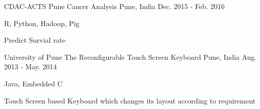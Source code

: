 

\begin{cventries}

  \cventry
    {CDAC-ACTS Pune} %
    {Cancer Analysis} %
    {Pune, India} %
    {Dec. 2015 - Feb. 2016} %
    {
      \begin{cvitems} %
        \item {R, Python, Hadoop, Pig}
        \item {Predict Survial rate}
      \end{cvitems}
    }
  
  \cventry
    {University of Pune} %
    {The Reconfigurable Touch Screen Keyboard} %
    {Pune, India} %
    {Aug. 2013 - May. 2014} %
    {
      \begin{cvitems} %
        \item {Java, Embedded C}
        \item {Touch Screen based Keyboard which changes its layout according to requirement}
      \end{cvitems}
    }


\end{cventries}
